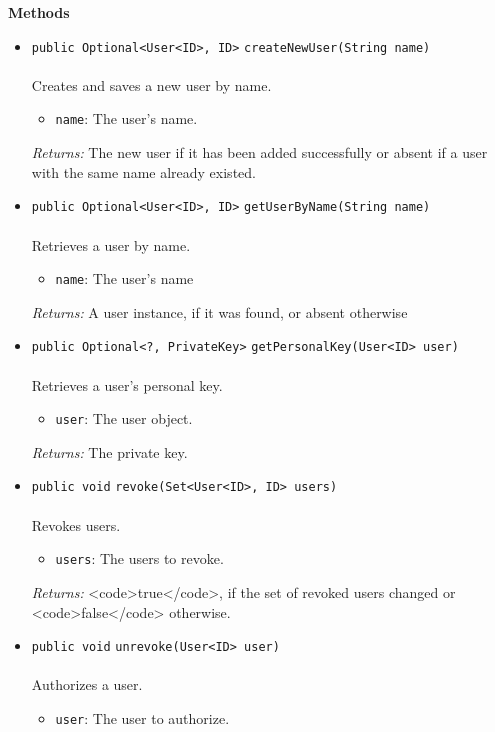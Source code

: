 \textbf{\sffamily Methods}
\begin{itemize}
\item \lstinline|public Optional<User<ID>, ID>| \lstinline|createNewUser|\lstinline|(String name)|\\ \\[-0.6em]
Creates and saves a new user by name.
\begin{itemize}
\item \lstinline|name|: The user's name.
\end{itemize}

\emph{Returns:} The new user if it has been added successfully or absent
         if a user with the same name already existed.

\item \lstinline|public Optional<User<ID>, ID>| \lstinline|getUserByName|\lstinline|(String name)|\\ \\[-0.6em]
Retrieves a user by name.
\begin{itemize}
\item \lstinline|name|: The user's name
\end{itemize}

\emph{Returns:} A user instance, if it was found, or absent otherwise

\item \lstinline|public Optional<?, PrivateKey>| \lstinline|getPersonalKey|\lstinline|(User<ID> user)|\\ \\[-0.6em]
Retrieves a user's personal key.
\begin{itemize}
\item \lstinline|user|: The user object.
\end{itemize}

\emph{Returns:} The private key.

\item \lstinline|public void| \lstinline|revoke|\lstinline|(Set<User<ID>, ID> users)|\\ \\[-0.6em]
Revokes users.
\begin{itemize}
\item \lstinline|users|: The users to revoke.
\end{itemize}

\emph{Returns:} <code>true</code>, if the set of revoked users changed or <code>false</code> otherwise.

\item \lstinline|public void| \lstinline|unrevoke|\lstinline|(User<ID> user)|\\ \\[-0.6em]
Authorizes a user.
\begin{itemize}
\item \lstinline|user|: The user to authorize.
\end{itemize}


\end{itemize}
